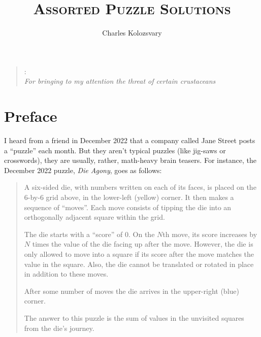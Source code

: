 \documentclass{book}
\begin{document}
\title{{\centering\Huge\textsc{Assorted Puzzle Solutions}}}
\author{\Large Charles Kolozsvary}
\date{}

\maketitle

\begin{quote}
{: \\ 
\hfill {\sl For bringing to my attention the threat of certain crustaceans}}
\end{quote}
\chapter*{Preface}
I heard from a friend in December 2022 that a company called Jane Street posts a ``puzzle'' each month. But they aren't typical puzzles (like jig-saws or crosswords), they are usually, rather, math-heavy brain teasers. For instance, the December 2022 puzzle, \emph{Die Agony}, goes as follows:
\[

\]
\begin{quote}
A six-sided die, with numbers written on each of its faces, is placed on the 6-by-6 grid above, in the lower-left (yellow) corner. It then makes a sequence of ``moves''. Each move consists of tipping the die into an orthogonally adjacent square within the grid.

The die starts with a ``score'' of 0. On the $N$th move, its score increases by $N$ times the value of the die facing up after the move. However, the die is only allowed to move into a square if its score after the move matches the value in the square. Also, the die cannot be translated or rotated in place in addition to these moves.

After some number of moves the die arrives in the upper-right (blue) corner.

The answer to this puzzle is the sum of values in the unvisited squares from the die's journey.
\end{quote}
\end{document}
